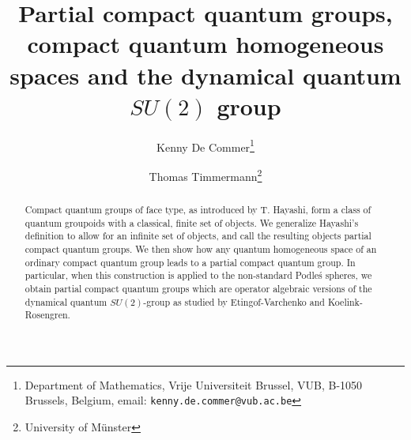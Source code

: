 \documentclass[11pt]{article}
\date{}
\theoremstyle{definition}
\numberwithin{equation}{section}
\begin{document}
\title{Partial compact quantum groups, compact quantum homogeneous spaces and the dynamical quantum $SU(2)$ group}

\author{Kenny De Commer\thanks{Department of Mathematics, Vrije Universiteit Brussel, VUB, B-1050 Brussels, Belgium, email: {\tt kenny.de.commer@vub.ac.be}}
\and Thomas Timmermann\thanks{University of M\"{u}nster}}

\maketitle

\begin{abstract}
\noindent Compact quantum groups of face type, as introduced by T. Hayashi, form a class of quantum groupoids with a classical, finite set of objects. We generalize Hayashi's definition to allow for an infinite set of objects, and call the resulting objects partial compact quantum groups. We then show how any quantum homogeneous space of an ordinary compact quantum group leads to a partial compact quantum group. In particular, when this construction is applied to the non-standard Podle\'{s} spheres, we obtain partial compact quantum groups which are operator algebraic versions of the dynamical quantum $SU(2)$-group as studied by Etingof-Varchenko and Koelink-Rosengren.%
\end{abstract}













\end{document}
